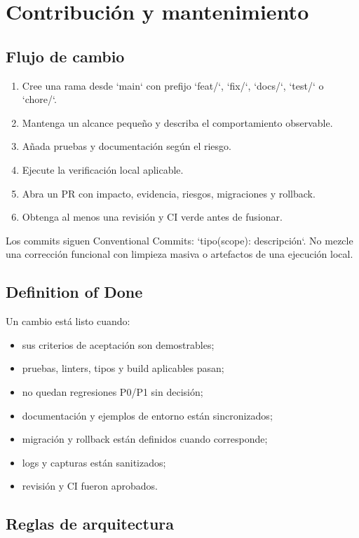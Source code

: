 \chapter{Contribución y mantenimiento}

\section{Flujo de cambio}

\begin{enumerate}
  \item Cree una rama desde `main` con prefijo `feat/`, `fix/`, `docs/`, `test/` o `chore/`.
  \item Mantenga un alcance pequeño y describa el comportamiento observable.
  \item Añada pruebas y documentación según el riesgo.
  \item Ejecute la verificación local aplicable.
  \item Abra un PR con impacto, evidencia, riesgos, migraciones y rollback.
  \item Obtenga al menos una revisión y CI verde antes de fusionar.
\end{enumerate}

Los commits siguen Conventional Commits: `tipo(scope): descripción`. No mezcle una corrección
funcional con limpieza masiva o artefactos de una ejecución local.

\section{Definition of Done}

Un cambio está listo cuando:

\begin{itemize}
  \item sus criterios de aceptación son demostrables;
  \item pruebas, linters, tipos y build aplicables pasan;
  \item no quedan regresiones P0/P1 sin decisión;
  \item documentación y ejemplos de entorno están sincronizados;
  \item migración y rollback están definidos cuando corresponde;
  \item logs y capturas están sanitizados;
  \item revisión y CI fueron aprobados.
\end{itemize}

\section{Reglas de arquitectura}

